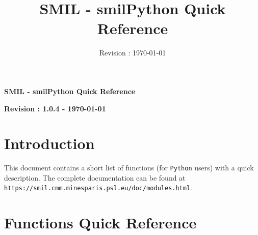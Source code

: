 \documentclass[10pt,a4paper]{article}
\title{SMIL - smilPython Quick Reference}
\author{}
\date{Revision : \today}
\begin{document}
\begin{center}
  \Huge
  \textbf{SMIL - smilPython Quick Reference}

  \Large
  \textbf{Revision : 1.0.4 - \today}
\end{center}

%
%
%
\section{Introduction}

This document contains a short list of functions (for \texttt{Python} users)
with a quick description. The complete documentation can be found at
\texttt{https://smil.cmm.minesparis.psl.eu/doc/modules.html}.



%
%
\section{Functions Quick Reference}
































\end{document}
